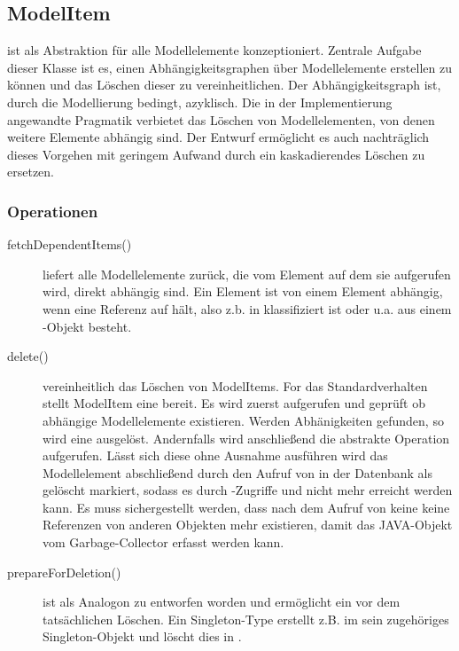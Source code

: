 \subsection{ModelItem}

 ist als Abstraktion für alle Modellelemente konzeptioniert. 
Zentrale Aufgabe dieser Klasse ist es, einen Abhängigkeitsgraphen über Modellelemente erstellen zu können und 
das Löschen dieser zu vereinheitlichen. Der Abhängigkeitsgraph ist, durch die Modellierung bedingt, azyklisch.
Die in der Implementierung angewandte Pragmatik verbietet das Löschen von Modellelementen, von denen weitere Elemente 
abhängig sind. Der Entwurf ermöglicht es auch nachträglich dieses Vorgehen mit geringem Aufwand durch ein kaskadierendes Löschen zu 
ersetzen. 
 

\subsubsection{Operationen}

\begin{description}
\item[fetchDependentItems()] 
liefert alle Modellelemente zurück, die vom Element auf dem sie aufgerufen wird, direkt abhängig sind.
Ein Element  ist von einem Element  abhängig, wenn  eine Referenz auf  hält, also z.b.   
 in  klassifiziert ist oder u.a. aus einem -Objekt besteht.
 
\item[delete()] vereinheitlich das Löschen von ModelItems. For das Standardverhalten stellt ModelItem eine   
bereit. Es wird zuerst  aufgerufen und geprüft ob abhängige Modellelemente 
existieren. Werden Abhänigkeiten gefunden, so wird eine  ausgelöst. Andernfalls wird anschließend 
die abstrakte Operation  aufgerufen. Lässt sich diese ohne Ausnahme ausführen wird das Modellelement 
abschließend durch den Aufruf von  in der Datenbank als gelöscht markiert, sodass es durch -Zugriffe 
und  nicht mehr erreicht werden kann. Es muss sichergestellt werden, dass nach dem Aufruf von  keine 
keine Referenzen von anderen Objekten mehr existieren, damit das JAVA-Objekt vom Garbage-Collector erfasst werden kann. 



\item[prepareForDeletion()] ist als Analogon zu  entworfen worden und ermöglicht ein 
 vor dem tatsächlichen Löschen. Ein Singleton-Type erstellt z.B. im  sein zugehöriges 
Singleton-Objekt und löscht dies in . 
\end{description}
